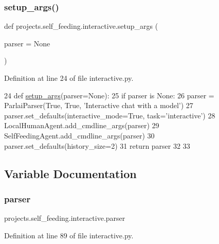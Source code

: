 \subsubsection{\texorpdfstring{setup\+\_\+args()}{setup\_args()}}
{\footnotesize\ttfamily def projects.\+self\+\_\+feeding.\+interactive.\+setup\+\_\+args (\begin{DoxyParamCaption}\item[{}]{parser = {\ttfamily None} }\end{DoxyParamCaption})}



Definition at line 24 of file interactive.\+py.


\begin{DoxyCode}
24 \textcolor{keyword}{def }\hyperlink{namespaceprojects_1_1self__feeding_1_1interactive_a2ad3b874d9caef6e76ea41e029b933f0}{setup\_args}(parser=None):
25     \textcolor{keywordflow}{if} parser \textcolor{keywordflow}{is} \textcolor{keywordtype}{None}:
26         parser = ParlaiParser(\textcolor{keyword}{True}, \textcolor{keyword}{True}, \textcolor{stringliteral}{'Interactive chat with a model'})
27     parser.set\_defaults(interactive\_mode=\textcolor{keyword}{True}, task=\textcolor{stringliteral}{'interactive'})
28     LocalHumanAgent.add\_cmdline\_args(parser)
29     SelfFeedingAgent.add\_cmdline\_args(parser)
30     parser.set\_defaults(history\_size=2)
31     \textcolor{keywordflow}{return} parser
32 
33 
\end{DoxyCode}


\subsection{Variable Documentation}
\mbox{\label{namespaceprojects_1_1self__feeding_1_1interactive_a21a1ccd7eaed52bc0c86433980389559}} 
\subsubsection{\texorpdfstring{parser}{parser}}
{\footnotesize\ttfamily projects.\+self\+\_\+feeding.\+interactive.\+parser}



Definition at line 89 of file interactive.\+py.

